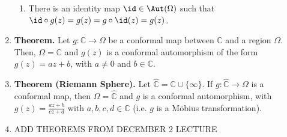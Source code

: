 \begin{enumerate}
\begin{enumerate}
        \item There is an identity map $\id \in \Aut(\Omega)$ such that $\id \circ g(z) = g(z) = g \circ \id(z) = g(z)$. 
    \end{enumerate}
    \item \textbf{Theorem. } Let $g: \mathbb{C} \to \Omega$ be a conformal map between $\mathbb{C}$ and a region $\Omega$. Then, $\Omega = \mathbb{C}$ and $g(z)$ is a conformal automorphism of the form $g(z) = az+b$, with $a \neq 0$ and $b \in \mathbb{C}$. 
    \item \textbf{Theorem (Riemann Sphere). } Let $\hat{\mathbb{C}} = \mathbb{C} \cup \{\infty\}$. If $g: \hat{\mathbb{C}} \to \Omega$ is a conformal map, then $\Omega = \hat{\mathbb{C}}$ and $g$ is a conformal automorphism, with $g(z) = \frac{az+b}{cz+d}$ with $a,b,c,d \in \mathbb{C}$ (i.e. $g$ is a Möbius transformation). 
    \item ADD THEOREMS FROM DECEMBER 2 LECTURE
\end{enumerate}



